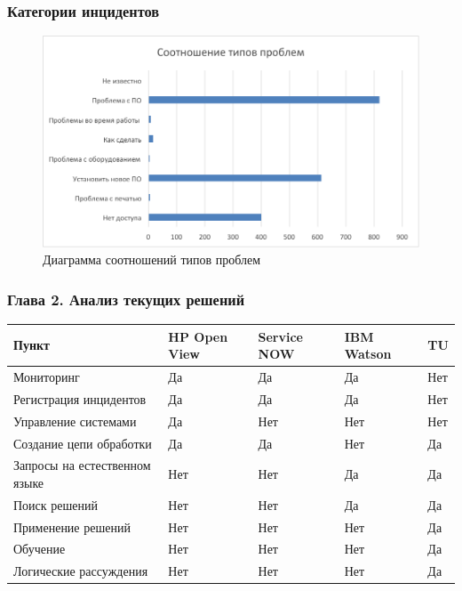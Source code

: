 \documentclass[14pt]{beamer}
\begin{document}
\begin{frame}
\frametitle{Категории инцидентов}
\begin{figure} [h] 
  \center
  \includegraphics [scale=0.7] {EngineerTasks}
  \caption{Диаграмма соотношений типов проблем} 
  \label{img:EngineerTasks}  
\end{figure}
\end{frame}


\begin{frame}
\frametitle{Глава 2. Анализ текущих решений}
\begin{table}
	
\small
\begin{tabular} {|p{5cm}|p{1cm}|p{1cm}|p{1cm}|p{1cm}|}

\hline
\textbf{Пункт} & HP Open View & Service NOW & IBM Watson & TU\\
\hline
   Мониторинг & Да & Да & Да & Нет \\
   \hline
   Регистрация инцидентов & Да & Да & Да & Нет\\
   \hline
   Управление системами & Да & Нет & Нет & Нет \\
   \hline 
   Создание цепи обработки & Да & Да & Нет & Да \\
   \hline 
   Запросы на естественном языке & Нет & Нет & Да & Да\\
   \hline 
   Поиск решений & Нет & Нет & Да & Да\\
   \hline 
   Применение решений & Нет & Нет & Нет & Да \\
   \hline
   Обучение & Нет & Нет & Нет & Да \\
   \hline
   Логические рассуждения & Нет & Нет & Нет & Да \\
   \hline
  
\end{tabular}
\end{table}
\end{frame}
\end{document}
